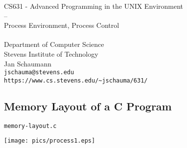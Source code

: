 \documentclass[xga]{xdvislides}
\begin{document}
\setfontphv

\lhead{\slidetitle}
\cfoot{\relax}
\rfoot{\Gray{\today}}

\newcommand{\smallish}{\fontsize{16}{16}\selectfont}

\vspace*{\fill}
\begin{center}
	\Hugesize
		CS631 - Advanced Programming in the UNIX Environment\\
		-- \\
		Process Environment, Process Control \\
	\hspace*{5mm}\blueline\\ [1em]
	\Normalsize
		Department of Computer Science\\
		Stevens Institute of Technology\\
		Jan Schaumann\\
		\verb+jschauma@stevens.edu+\\
		\verb+https://www.cs.stevens.edu/~jschauma/631/+
\end{center}
\vspace*{\fill}


\subsection{Memory Layout of a C Program}
{\tt memory-layout.c}
\begin{center}
	\texttt{[image: pics/process1.eps]}
\end{center}
\end{document}

